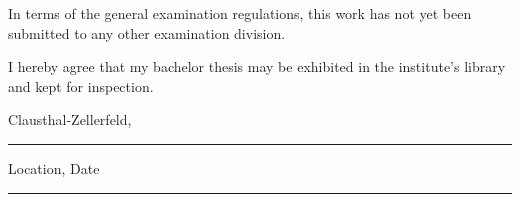 \noindent
In terms of the general examination regulations, this work has not yet been submitted to any other examination division.
\vspace{7.5ex}

\noindent
I hereby agree that my bachelor thesis  may be exhibited in the institute's library and kept for inspection. 

\makeatletter
\vspace{15ex}
\parbox{0.475\textwidth}{\centering Clausthal-Zellerfeld, {\britishdate{}} \hrule\strut\centering\footnotesize Location, Date} \hfill
\parbox{0.475\textwidth}{ \hrule\strut\centering\footnotesize \@author}
\makeatother
\vfill

